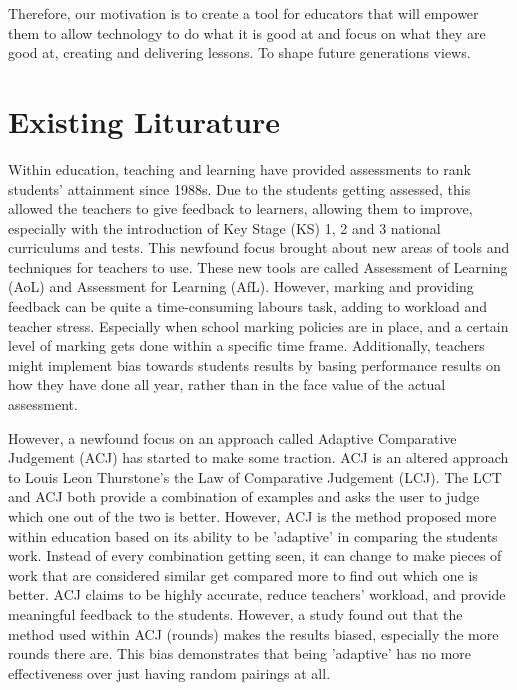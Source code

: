 	Therefore, our motivation is to create a tool for educators that will empower them to allow technology to do what it is good at and focus on what they are good at, creating and delivering lessons. To shape future generations views.




	\section{Existing Liturature}
	Within education, teaching and learning have provided assessments to rank students' attainment since 1988s. Due to the students getting assessed, this allowed the teachers to give feedback to learners, allowing them to improve, especially with the introduction of Key Stage (KS) 1, 2 and 3 national curriculums and tests. This newfound focus brought about new areas of tools and techniques for teachers to use. These new tools are called Assessment of Learning (AoL) and Assessment for Learning (AfL). However, marking and providing feedback can be quite a time-consuming labours task, adding to workload and teacher stress. Especially when school marking policies are in place, and a certain level of marking gets done within a specific time frame. Additionally, teachers might implement bias towards students results by basing performance results on how they have done all year, rather than in the face value of the actual assessment.
	
	However, a newfound focus on an approach called Adaptive Comparative Judgement (ACJ) has started to make some traction. ACJ is an altered approach to Louis Leon Thurstone's the Law of Comparative Judgement (LCJ). The LCT and ACJ both provide a combination of examples and asks the user to judge which one out of the two is better. However, ACJ is the method proposed more within education based on its ability to be 'adaptive' in comparing the students work. Instead of every combination getting seen, it can change to make pieces of work that are considered similar get compared more to find out which one is better. ACJ  claims to be highly accurate, reduce teachers' workload, and provide meaningful feedback to the students. However, a study found out that the method used within ACJ (rounds) makes the results biased, especially the more rounds there are. This bias demonstrates that being 'adaptive' has no more effectiveness over just having random pairings at all.
	
